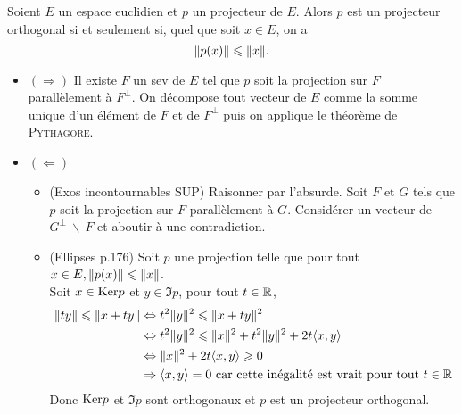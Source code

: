 \begin{tcolorbox}
    Soient $E$ un espace euclidien et $p$ un projecteur de $E$. Alors $p$ est un projecteur orthogonal si et seulement si, quel que soit $x \in E$, on a
    $$\Vert p(x) \Vert \leqslant \Vert x \Vert.$$
\end{tcolorbox}

\begin{itemize}
    \item $(\Rightarrow)$ Il existe $F$ un sev de $E$ tel que $p$ soit la projection sur $F$ parallèlement à $F^\perp$. On décompose tout vecteur de $E$ comme la somme unique d'un élément de $F$ et de $F^\perp$ puis on applique le théorème de \textsc{Pythagore}. 
    \item $(\Leftarrow)$ 
    \begin{itemize}
        \item (Exos incontournables SUP) Raisonner par l'absurde. Soit $F$ et $G$ tels que $p$ soit la projection sur $F$ parallèlement à $G$. Considérer un vecteur de $G^\perp\ \backslash\ F$ et aboutir à une contradiction.
        \item (Ellipses p.176) Soit $p$ une projection telle que pour tout $x \in E, \Vert p(x) \Vert \leqslant \Vert x \Vert$. \\
        Soit $x \in \mathrm{Ker} p$ et $y \in \Im p$, pour tout $t \in \mathbb{R}$, 
        \begin{align*}
            \Vert ty \Vert \leqslant \Vert x + ty \Vert &\Leftrightarrow t^2 \Vert y \Vert^2 \leqslant \Vert x+ty \Vert^2 \\
            &\Leftrightarrow t^2 \Vert y \Vert^2 \leqslant \Vert x \Vert^2 + t^2 \Vert y \Vert^2 + 2t \langle x, y \rangle \\
            &\Leftrightarrow \Vert x \Vert^2 + 2t \langle x, y \rangle \geqslant 0 \\
            &\Rightarrow \langle x, y \rangle = 0 \text{ car cette inégalité est vrait pour tout } t \in \mathbb{R}
        \end{align*}
        Donc $\mathrm{Ker} p$ et $\Im p$ sont orthogonaux et $p$ est un projecteur orthogonal.
    \end{itemize}
    
\end{itemize}